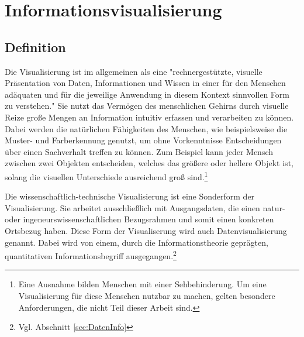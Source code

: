 \documentclass[a4paper, 12pt, DIV=calc, version=first, pdftex, headsepline, footsepline, bibtotocnumbered, liststotocnumbered]{scrreprt}
\begin{document}
\chapter{Informationsvisualisierung}
\label{cha:Informationsvisualisierung}
\section{Definition}
\label{sec:Definition}
Die Visualisierung ist im allgemeinen als eine "rechnergestützte, visuelle Präsentation von Daten, Informationen und Wissen
in einer für den Menschen adäquaten und für die jeweilige Anwendung in diesem Kontext sinnvollen Form
zu verstehen."\citep[S.\,3]{Schumann}
Sie nutzt das Vermögen des menschlichen Gehirns durch visuelle Reize große Mengen an Information
intuitiv erfassen und verarbeiten zu können. Dabei werden die natürlichen Fähigkeiten des Menschen,
wie beispielsweise die Muster- und Farberkennung genutzt, um ohne Vorkenntnisse Entscheidungen über
einen Sachverhalt treffen zu können. Zum Beispiel kann jeder Mensch zwischen zwei Objekten entscheiden,
welches das größere oder hellere Objekt ist, solang die visuellen Unterschiede ausreichend groß sind.\footnote{
Eine Ausnahme bilden Menschen mit einer Sehbehinderung. Um eine Visualisierung für diese Menschen
nutzbar zu machen, gelten besondere Anforderungen, die nicht Teil dieser Arbeit sind.}

Die wissenschaftlich-technische Visualisierung ist eine Sonderform der Visualisierung. Sie arbeitet ausschließlich mit Ausgangsdaten,
die einen natur- oder ingeneurswissenschaftlichen Bezugsrahmen und somit einen konkreten Ortsbezug haben. Diese Form der
Visualiserung wird auch Datenvisualisierung genannt. Dabei wird von einem, durch die Informationstheorie
geprägten, quantitativen Informationsbegriff ausgegangen.\footnote{Vgl. 
Abschnitt \ref{sec:DatenInfo}}
\end{document}
